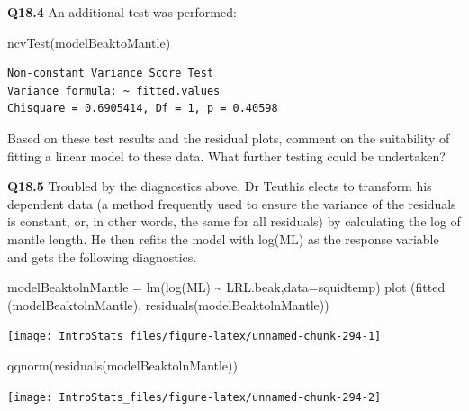 \documentclass[
  oneside]{krantz}
\newenvironment{Shaded}{\begin{snugshade}}{\end{snugshade}}
\newcommand{\AttributeTok}[1]{\textcolor[rgb]{0.77,0.63,0.00}{#1}}
\newcommand{\FunctionTok}[1]{\textcolor[rgb]{0.00,0.00,0.00}{#1}}
\newcommand{\NormalTok}[1]{#1}
\newcommand{\OtherTok}[1]{\textcolor[rgb]{0.56,0.35,0.01}{#1}}
\newcommand{\SpecialCharTok}[1]{\textcolor[rgb]{0.00,0.00,0.00}{#1}}
\begin{document}
\textbf{Q18.4} An additional test was performed:

\begin{Shaded}
\begin{Highlighting}[]
\FunctionTok{ncvTest}\NormalTok{(modelBeaktoMantle)}
\end{Highlighting}
\end{Shaded}

\begin{verbatim}
Non-constant Variance Score Test 
Variance formula: ~ fitted.values 
Chisquare = 0.6905414, Df = 1, p = 0.40598
\end{verbatim}

Based on these test results and the residual plots, comment on the suitability of fitting a linear model to these data. What further testing could be
undertaken?

\newpage

\textbf{Q18.5} Troubled by the diagnostics above, Dr Teuthis elects to transform his dependent data (a method frequently used to ensure the variance of the residuals is constant, or, in other words, the same for all residuals) by calculating the log of mantle length. He then refits the model with log(ML) as the response variable and gets the following diagnostics.

\begin{Shaded}
\begin{Highlighting}[]
\NormalTok{modelBeaktolnMantle }\OtherTok{=}  \FunctionTok{lm}\NormalTok{(}\FunctionTok{log}\NormalTok{(ML) }\SpecialCharTok{\textasciitilde{}}\NormalTok{ LRL.beak,}\AttributeTok{data=}\NormalTok{squidtemp)}
\FunctionTok{plot}\NormalTok{ (}\FunctionTok{fitted}\NormalTok{ (modelBeaktolnMantle), }\FunctionTok{residuals}\NormalTok{(modelBeaktolnMantle))}
\end{Highlighting}
\end{Shaded}

\begin{center}\texttt{[image: IntroStats\_files/figure-latex/unnamed-chunk-294-1]} \end{center}

\begin{Shaded}
\begin{Highlighting}[]
\FunctionTok{qqnorm}\NormalTok{(}\FunctionTok{residuals}\NormalTok{(modelBeaktolnMantle))}
\end{Highlighting}
\end{Shaded}

\begin{center}\texttt{[image: IntroStats\_files/figure-latex/unnamed-chunk-294-2]} \end{center}
\end{document}

